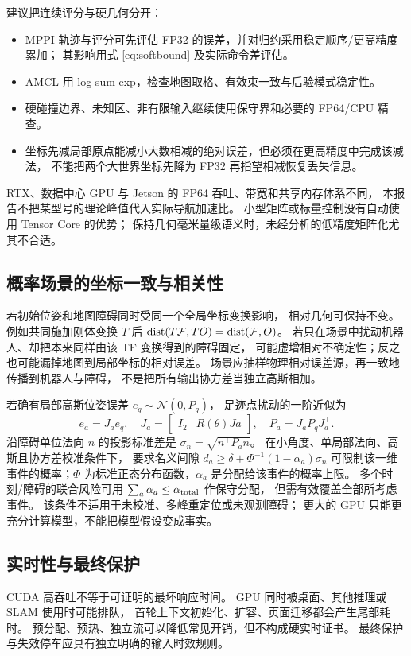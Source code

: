 建议把连续评分与硬几何分开：
\begin{itemize}
\item MPPI 轨迹与评分可先评估 FP32 的误差，并对归约采用稳定顺序/更高精度累加；
其影响用式 \eqref{eq:softbound} 及实际命令差评估。
\item AMCL 用 log-sum-exp，检查地图取格、有效束一致与后验模式稳定性。
\item 硬碰撞边界、未知区、非有限输入继续使用保守界和必要的 FP64/CPU 精查。
\item 坐标先减局部原点能减小大数相减的绝对误差，但必须在更高精度中完成该减法，
不能把两个大世界坐标先降为 FP32 再指望相减恢复丢失信息。
\end{itemize}
RTX、数据中心 GPU 与 Jetson 的 FP64 吞吐、带宽和共享内存体系不同，
本报告不把某型号的理论峰值代入实际导航加速比。
小型矩阵或标量控制没有自动使用 Tensor Core 的优势；
保持几何毫米量级语义时，未经分析的低精度矩阵化尤其不合适。

\subsection{概率场景的坐标一致与相关性}
若初始位姿和地图障碍同时受同一个全局坐标变换影响，
相对几何可保持不变。
例如共同施加刚体变换 $T$ 后
$\operatorname{dist}(T\mathcal F,T O)=\operatorname{dist}(\mathcal F,O)$。
若只在场景中扰动机器人、却把本来同样由该 TF 变换得到的障碍固定，
可能虚增相对不确定性；反之也可能漏掉地图到局部坐标的相对误差。
场景应抽样物理相对误差源，再一致地传播到机器人与障碍，
不是把所有输出协方差当独立高斯相加。

若确有局部高斯位姿误差 $e_q\sim\mathcal N(0,P_q)$，
足迹点扰动的一阶近似为
\[
e_a=J_ae_q,\quad
J_a=\begin{bmatrix}I_2&R(\theta)Ja\end{bmatrix},\quad
P_a=J_aP_qJ_a^\top.
\]
沿障碍单位法向 $n$ 的投影标准差是
$\sigma_n=\sqrt{n^\top P_an}$。
在小角度、单局部法向、高斯且协方差校准条件下，
要求名义间隙
$d_a\ge\delta+\Phi^{-1}(1-\alpha_a)\sigma_n$
可限制该一维事件的概率；$\Phi$ 为标准正态分布函数，$\alpha_a$ 是分配给该事件的概率上限。
多个时刻/障碍的联合风险可用
$\sum_a\alpha_a\le\alpha_{\rm total}$ 作保守分配，
但需有效覆盖全部所考虑事件。
该条件不适用于未校准、多峰重定位或未观测障碍；
更大的 GPU 只能更充分计算模型，不能把模型假设变成事实。

\subsection{实时性与最终保护}
CUDA 高吞吐不等于可证明的最坏响应时间。
GPU 同时被桌面、其他推理或 SLAM 使用时可能排队，
首轮上下文初始化、扩容、页面迁移都会产生尾部耗时。
预分配、预热、独立流可以降低常见开销，但不构成硬实时证书。
最终保护与失效停车应具有独立明确的输入时效规则。

